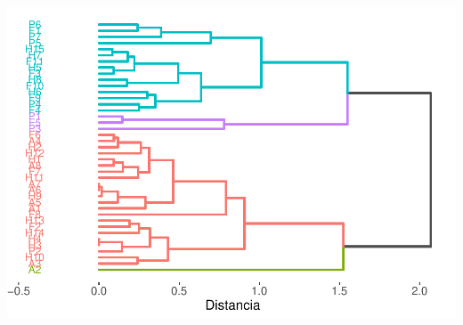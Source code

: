 \documentclass[
]{article}
\begin{document}
\begin{center}\includegraphics{parte_6_files/figure-latex/unnamed-chunk-7-1} \end{center}
\end{document}
